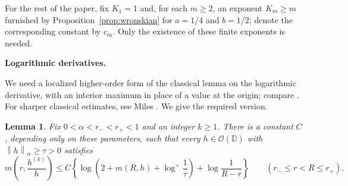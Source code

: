 \documentclass[12pt,letterpaper,reqno]{amsart}
\newtheorem{lem}[thm]{Lemma}
\theoremstyle{definition}
\numberwithin{equation}{section}
\newcommand{\D}{\mathbb D}
\newcommand{\OO}{\mathcal O}
\newcommand{\norm}[2]{\left\lVert #1\right\rVert_{#2}}
\begin{document}
	For the rest of the paper, fix $K_1=1$ and, for each $m\ge2$, an
	exponent $K_m\ge m$ furnished by Proposition~\ref{prop:wronskian}
	for $a=1/4$ and $b=1/2$; denote the corresponding constant by $c_m$.
	Only the existence of these finite exponents is needed.
	
	\medskip\noindent\textbf{Logarithmic derivatives.}
	
	We need a localized higher-order form of the classical lemma on the
	logarithmic derivative, with an interior maximum in place of a value
	at the origin; compare \cite[Chapter~VIII]{Lan87}. For sharper
	classical estimates, see Miles \cite{Mil92}. We give the required
	version. 
	
	\begin{lem}\label{lem:logderivative}
		Fix $0<\alpha<r_-<r_+<1$ and an integer $k\ge1$.
		There is a constant $C$, depending only on these parameters, such
		that every $h\in\OO(\D)$ with $\norm{h}{\alpha}\ge\tau>0$ satisfies
		\begin{equation}\label{eq:logderivative-bound}
			m\left(r,\frac{h^{(k)}}h\right)
			\le C\left\{
			\log\left(2+m(R,h)+\log^+\frac1\tau\right)
			+\log\frac1{R-r}\right\}
			\qquad(r_-\le r<R\le r_+).
		\end{equation}
	\end{lem}
	
\end{document}
